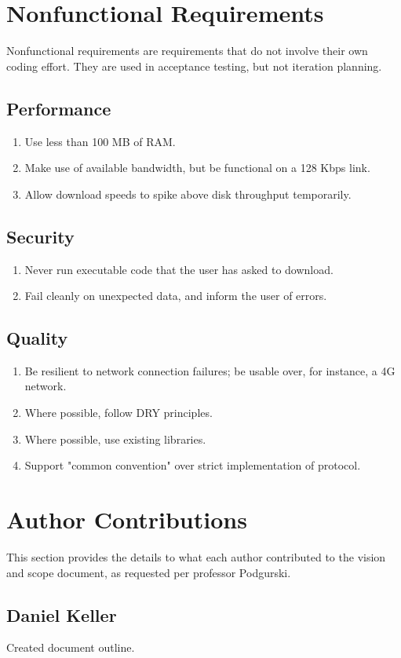 \documentclass[letter]{scrartcl}
\begin{document}
\section{Nonfunctional Requirements}
Nonfunctional requirements are requirements that do not involve their own coding effort. They are used in acceptance testing, but not iteration planning. 
\subsection{Performance}
\begin{enumerate}
\item Use less than 100 MB of RAM.
\item Make use of available bandwidth, but be functional on a 128 Kbps link.
\item Allow download speeds to spike above disk throughput temporarily.
\end{enumerate}
\subsection{Security}
\begin{enumerate}
\item Never run executable code that the user has asked to download.
\item Fail cleanly on unexpected data, and inform the user of errors.
\end{enumerate}
\subsection{Quality}
\begin{enumerate}
\item Be resilient to network connection failures; be usable over, for instance, a 4G network.
\item Where possible, follow DRY principles.
\item Where possible, use existing libraries.
\item Support "common convention" over strict implementation of protocol.
\end{enumerate}
\pagebreak
\section{Author Contributions}
This section provides the details to what each author contributed to the vision and scope document, as requested per professor Podgurski.
\subsection{Daniel Keller}
Created document outline.
\end{document}
